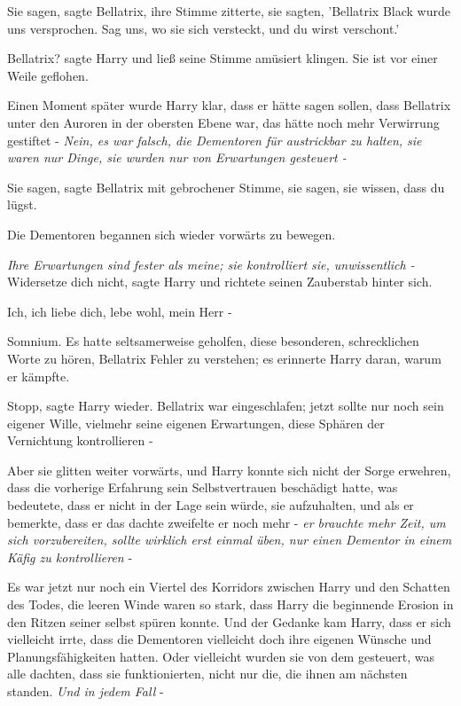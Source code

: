 Sie sagen\grqq{}, sagte Bellatrix, ihre Stimme zitterte, \glqq{}sie sagten,
'Bellatrix Black wurde uns versprochen. Sag uns, wo sie sich versteckt, und du
wirst verschont.'\grqq{}

\glqq{}Bellatrix?\grqq{} sagte Harry und ließ seine Stimme amüsiert klingen.
\glqq{}Sie ist vor einer Weile geflohen.\grqq{}

Einen Moment später wurde Harry klar, dass er hätte sagen sollen, dass Bellatrix
unter den Auroren in der obersten Ebene war, das hätte noch mehr Verwirrung
gestiftet - \emph{Nein, es war falsch, die Dementoren für austrickbar zu halten,
sie waren nur Dinge, sie wurden nur von Erwartungen gesteuert -}

\glqq{}Sie sagen\grqq{}, sagte Bellatrix mit gebrochener Stimme, \glqq{}sie sagen,
sie wissen, dass du lügst.\grqq{}

Die Dementoren begannen sich wieder vorwärts zu bewegen.

\emph{Ihre Erwartungen sind fester als meine; sie kontrolliert sie,
unwissentlich -} \glqq{}Widersetze dich nicht\grqq{}, sagte Harry und richtete
seinen Zauberstab hinter sich.

\glqq{}Ich, ich liebe dich, lebe wohl, mein Herr -\grqq{}

\glqq{}Somnium.\grqq{} Es hatte seltsamerweise geholfen, diese besonderen,
schrecklichen Worte zu hören, Bellatrix Fehler zu verstehen; es erinnerte Harry
daran, warum er kämpfte.

\glqq{}Stopp\grqq{}, sagte Harry wieder. Bellatrix war eingeschlafen; jetzt
sollte nur noch sein eigener Wille, vielmehr seine eigenen Erwartungen, diese
Sphären der Vernichtung kontrollieren -

Aber sie glitten weiter vorwärts, und Harry konnte sich nicht der Sorge
erwehren, dass die vorherige Erfahrung sein Selbstvertrauen beschädigt hatte,
was bedeutete, dass er nicht in der Lage sein würde, sie aufzuhalten, und als er
bemerkte, dass er das dachte zweifelte er noch mehr - \emph{er brauchte mehr
Zeit, um sich vorzubereiten, sollte wirklich erst einmal üben, nur einen
Dementor in einem Käfig zu kontrollieren} -

Es war jetzt nur noch ein Viertel des Korridors zwischen Harry und den Schatten
des Todes, die leeren Winde waren so stark, dass Harry die beginnende Erosion in
den Ritzen seiner selbst spüren konnte. Und der Gedanke kam Harry, dass er sich
vielleicht irrte, dass die Dementoren vielleicht doch ihre eigenen Wünsche und
Planungsfähigkeiten hatten. Oder vielleicht wurden sie von dem gesteuert, was
alle dachten, dass sie funktionierten, nicht nur die, die ihnen am nächsten
standen. \emph{Und in jedem Fall} -

